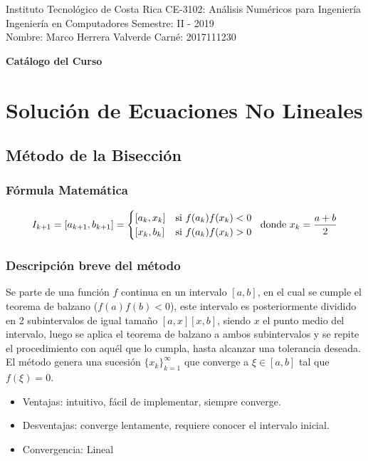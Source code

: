 \documentclass[12pt]{article}
\begin{document}
Instituto Tecnológico de Costa Rica \hfill CE-3102: Análisis Numéricos para Ingeniería\\
Ingeniería en Computadores \hfill Semestre: II - 2019\\
Nombre: Marco Herrera Valverde \hfill Carné: 2017111230


\begin{center}\textbf{\huge Catálogo del Curso}  \end{center}


\section{Solución de Ecuaciones No Lineales}

\subsection{Método de la Bisección}

\subsubsection{Fórmula Matemática}
\[ I_{k+1} = [a_{k+1},b_{k+1}] = \begin{cases} 
      [a_k,x_k] & \text{si } f(a_k)f(x_k) < 0 \\
      [x_k,b_k] & \text{si } f(a_k)f(x_k) > 0 
   \end{cases}\\
   \; \text{ donde } x_k = \frac{a+b}{2} 
\]
\subsubsection{Descripción breve del método}
Se parte de una función \(f\) continua en un intervalo \([a,b]\), en el cual se cumple el teorema de balzano (\(f(a)f(b) < 0\)), este intervalo es posteriormente dividido en 2 subintervalos de igual tamaño \([a,x] [x,b]\), siendo \(x\) el punto medio del intervalo, luego se aplica el teorema de balzano a ambos subintervalos y se repite el procedimiento con aquél que lo cumpla, hasta alcanzar una tolerancia deseada. El método genera una sucesión \(\{x_{k}\}_{k=1}^\infty\) que converge a \(\xi \in [a,b]\) tal que \(f(\xi) = 0\).

\begin{itemize}
    \item Ventajas: intuitivo, fácil de implementar, siempre converge.
    \item Desventajas: converge lentamente, requiere conocer el intervalo inicial.
    \item Convergencia: Lineal
\end{itemize}
\end{document}
